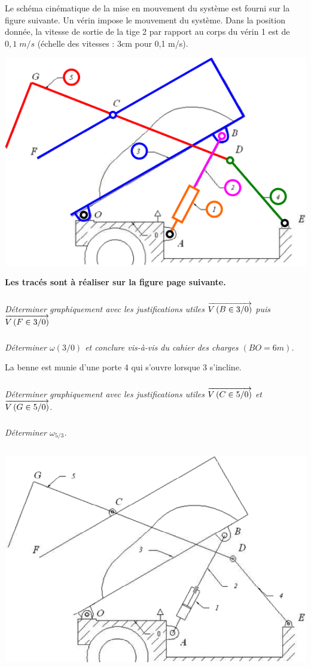 \documentclass[10pt,fleqn]{article} %
\begin{document}
Le schéma cinématique de la mise en mouvement du système est fourni sur la figure suivante. Un vérin impose le mouvement du système. Dans la position donnée, la vitesse de sortie de la tige 2 par rapport au corps du vérin 1 est de $0,1\; m/s$ (échelle des vitesses : 3cm pour 0,1 m/s).


\begin{center}
\includegraphics[width=.6\textwidth]{images/fig4}
\end{center}

\textbf{Les tracés sont à réaliser sur la figure page suivante.}
\subparagraph{}
\textit{Déterminer graphiquement avec les justifications utiles $\overrightarrow{V\left( {B} \in {3}/{0}\right)}$ puis $\overrightarrow{V\left( {F} \in {3}/{0}\right)}$}


\subparagraph{}
\textit{Déterminer $\omega(3/0)$ et conclure vis-à-vis du cahier des charges $(BO=6m)$.}

La benne est munie d'une porte 4 qui s'ouvre lorsque 3 s'incline.


\subparagraph{}
\textit{Déterminer graphiquement avec les justifications utiles $\overrightarrow{V\left( {C} \in {5}/{0}\right)}$ et $\overrightarrow{V\left( {G} \in {5}/{0}\right)}$.}


\subparagraph{}
\textit{Déterminer $\omega_{5/3}$.}


$$ \quad $$
\vspace{6cm}

\begin{center}
\includegraphics[width=.7\textwidth]{images/fig5}
\end{center}
\end{document}
